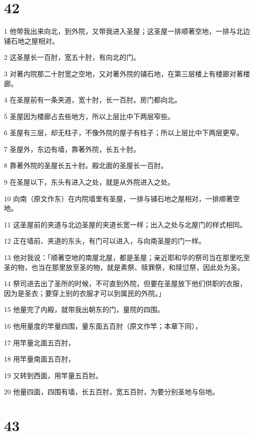 \chapter{42}

\par 1 他带我出来向北，到外院，又带我进入圣屋；这圣屋一排顺著空地，一排与北边铺石地之屋相对。
\par 2 这圣屋长一百肘，宽五十肘，有向北的门。
\par 3 对著内院那二十肘宽之空地，又对著外院的铺石地，在第三层楼上有楼廊对著楼廊。
\par 4 在圣屋前有一条夹道，宽十肘，长一百肘。房门都向北。
\par 5 圣屋因为楼廊占去些地方，所以上层比中下两层窄些。
\par 6 圣屋有三层，却无柱子，不像外院的屋子有柱子；所以上层比中下两层更窄。
\par 7 圣屋外，东边有墙，靠著外院，长五十肘。
\par 8 靠著外院的圣屋长五十肘。殿北面的圣屋长一百肘。
\par 9 在圣屋以下，东头有进入之处，就是从外院进入之处。
\par 10 向南（原文作东）在内院墙里有圣屋，一排与铺石地之屋相对，一排顺著空地。
\par 11 这圣屋前的夹道与北边圣屋的夹道长宽一样；出入之处与北屋门的样式相同。
\par 12 正在墙前、夹道的东头，有门可以进入，与向南圣屋的门一样。
\par 13 他对我说：「顺著空地的南屋北屋，都是圣屋；亲近耶和华的祭司当在那里吃至圣的物，也当在那里放至圣的物，就是素祭、赎罪祭，和赎愆祭，因此处为圣。
\par 14 祭司进去出了圣所的时候，不可直到外院，但要在圣屋放下他们供职的衣服，因为是圣衣；要穿上别的衣服才可以到属民的外院。」
\par 15 他量完了内殿，就带我出朝东的门，量院的四围。
\par 16 他用量度的竿量四围，量东面五百肘（原文作竿；本章下同），
\par 17 用竿量北面五百肘，
\par 18 用竿量南面五百肘，
\par 19 又转到西面，用竿量五百肘。
\par 20 他量四面，四围有墙，长五百肘，宽五百肘，为要分别圣地与俗地。

\chapter{43}

